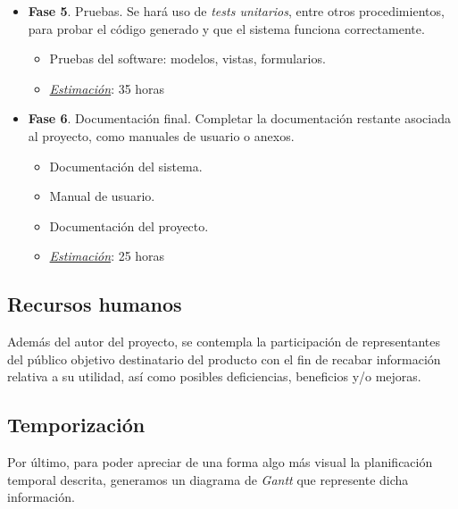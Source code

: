 \begin{itemize}
	\item \textbf{Fase 5}. Pruebas. Se hará uso de \textit{tests unitarios}, entre otros procedimientos, para probar el código generado y que el sistema funciona correctamente.
	\begin{itemize}
		\item Pruebas del software: modelos, vistas, formularios.
		\item \underline{\textit{Estimación}}: 35 horas
	\end{itemize}
	
	\item \textbf{Fase 6}. Documentación final. Completar la documentación restante asociada al proyecto, como manuales de usuario o anexos.
	\begin{itemize}
		\item Documentación del sistema.
		\item Manual de usuario.
		\item Documentación del proyecto.
		\item \underline{\textit{Estimación}}: 25 horas
	\end{itemize}
\end{itemize}

\subsection{Recursos humanos}

Además del autor del proyecto, se contempla la participación de representantes del público objetivo destinatario del producto con el fin de recabar información relativa a su utilidad, así como posibles deficiencias, beneficios y/o mejoras.


\subsection{Temporización}

Por último, para poder apreciar de una forma algo más visual la planificación temporal descrita, generamos un diagrama de \textit{Gantt} que represente dicha información.

